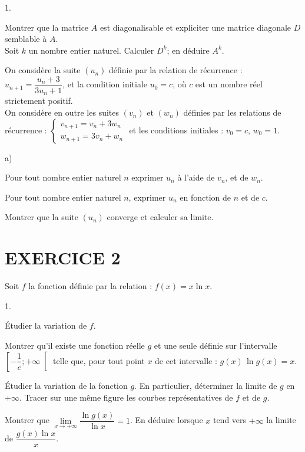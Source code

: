 \documentclass[11pt]{article}%
\begin{document}
\begin{noliste}{1.}
 \setlength{\itemsep}{4mm}
\item Montrer que la matrice $A$ est diagonalisable et expliciter une
matrice diagonale $D$ semblable à $A$.\\
Soit $k$ un nombre entier naturel. Calculer $D^{k}$; en déduire
$A^{k}$.

\item On considère la suite $\left( u_{n}\right) $ définie par la
relation
de récurrence : \quad $u_{n + 1} = \dfrac{u_{n} + 3}{3u_{n} + 1}$, et
la condition
initiale $u_{0} = c$, où $c$ est un nombre réel strictement positif.\\
On considère en outre les suites $\left( v_{n}\right) $ et $\left(
w_{n}\right) $ définies par les relations de récurrence : $\left\{ 
\begin{array}{l}
v_{n + 1} = v_{n} + 3w_{n} \\
w_{n + 1} = 3v_{n} + w_{n}
\end{array}
\right. $ et les conditions initiales : $v_{0} = c$, $w_{0} = 1$.

\begin{noliste}{a)}
 \setlength{\itemsep}{2mm}
\item Pour tout nombre entier naturel $n$ exprimer $u_{n}$ à l'aide de
$v_{n}
$, et de $w_{n}$.

\item Pour tout nombre entier naturel $n$, exprimer $u_{n}$ en fonction
de $n
$ et de $c$.

\item Montrer que la suite $\left( u_{n}\right) $ converge et calculer
sa
limite.
\end{noliste}
\end{noliste}

\section*{EXERCICE 2 }

Soit $f$ la fonction définie par la relation : $f\left( x\right) = x\ln
x$.

\begin{noliste}{1.}
 \setlength{\itemsep}{4mm}
\item Étudier la variation de $f$.

\item Montrer qu'il existe une fonction réelle $g$ et une seule définie
sur
l'intervalle $\left[ -\dfrac{1}{e}; + \infty \right[ $ telle que, pour
tout
point $x$ de cet intervalle : $g\left( x\right) \,\ln g\left( x\right)
= x$.

\item Étudier la variation de la fonction $g$. En particulier,
déterminer la
limite de $g$ en $ + \infty $. Tracer sur une même figure les courbes
représentatives de $f$ et de $g$.

\item Montrer que $\underset{x\rightarrow + \infty }{\lim }\dfrac{\ln
g\left(
x\right) }{\ln x} = 1$. En déduire lorsque $x$ tend vers $ + \infty $
la limite
de $\dfrac{g\left( x\right) \ln x}{x}$.
\end{noliste}
\end{document}
